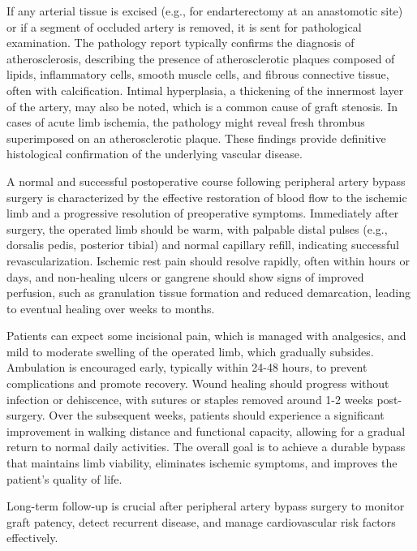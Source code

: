 If any arterial tissue is excised (e.g., for endarterectomy at an anastomotic site) or if a segment of occluded artery is removed, it is sent for pathological examination. The pathology report typically confirms the diagnosis of atherosclerosis, describing the presence of atherosclerotic plaques composed of lipids, inflammatory cells, smooth muscle cells, and fibrous connective tissue, often with calcification. Intimal hyperplasia, a thickening of the innermost layer of the artery, may also be noted, which is a common cause of graft stenosis. In cases of acute limb ischemia, the pathology might reveal fresh thrombus superimposed on an atherosclerotic plaque. These findings provide definitive histological confirmation of the underlying vascular disease.

A normal and successful postoperative course following peripheral artery bypass surgery is characterized by the effective restoration of blood flow to the ischemic limb and a progressive resolution of preoperative symptoms. Immediately after surgery, the operated limb should be warm, with palpable distal pulses (e.g., dorsalis pedis, posterior tibial) and normal capillary refill, indicating successful revascularization. Ischemic rest pain should resolve rapidly, often within hours or days, and non-healing ulcers or gangrene should show signs of improved perfusion, such as granulation tissue formation and reduced demarcation, leading to eventual healing over weeks to months.

Patients can expect some incisional pain, which is managed with analgesics, and mild to moderate swelling of the operated limb, which gradually subsides. Ambulation is encouraged early, typically within 24-48 hours, to prevent complications and promote recovery. Wound healing should progress without infection or dehiscence, with sutures or staples removed around 1-2 weeks post-surgery. Over the subsequent weeks, patients should experience a significant improvement in walking distance and functional capacity, allowing for a gradual return to normal daily activities. The overall goal is to achieve a durable bypass that maintains limb viability, eliminates ischemic symptoms, and improves the patient's quality of life.

Long-term follow-up is crucial after peripheral artery bypass surgery to monitor graft patency, detect recurrent disease, and manage cardiovascular risk factors effectively.

